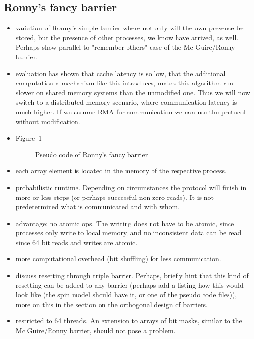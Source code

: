 \documentclass[a4paper, 10pt]{article}
\begin{document}
\subsection{Ronny's fancy barrier}
\begin{itemize}
	\item variation of Ronny's simple barrier where not only will the own presence be stored, but the presence of other processes, we know have arrived, as well. Perhaps show parallel to "remember others" case of the Mc Guire/Ronny barrier.
	\item evaluation has shown that cache latency is so low, that the additional computation a mechanism like this introduces, makes this algorithm run slower on shared memory systems than the unmodified one. Thus we will now switch to a distributed memory scenario, where communication latency is much higher. If we assume RMA for communication we can use the protocol without modification.
	\item Figure~\ref{fig:ronny-fancy-no-reset}
		\begin{figure}[htbp]
			\centering
			
			\caption{Pseudo code of Ronny's fancy barrier}
			\label{fig:ronny-fancy-no-reset}
		\end{figure}
	\item each array element is located in the memory of the respective process.
	\item probabilistic runtime. Depending on circumstances the protocol will finish in more or less steps (or perhaps successful non-zero reads). It is not predetermined what is communicated and with whom.
	\item advantage: no atomic ops. The writing does not have to be atomic, since processes only write to local memory, and no inconsistent data can be read since 64 bit reads and writes are atomic.
	\item more computational overhead (bit shuffling) for less communication.
	\item discuss resetting through triple barrier. Perhaps, briefly hint that this kind of resetting can be added to any barrier (perhaps add a listing how this would look like (the spin model should have it, or one of the pseudo code files)), more on this in the section on the orthogonal design of barriers.
	\item restricted to 64 threads. An extension to arrays of bit masks, similar to the Mc Guire/Ronny barrier, should not pose a problem.
\end{itemize}
\end{document}
